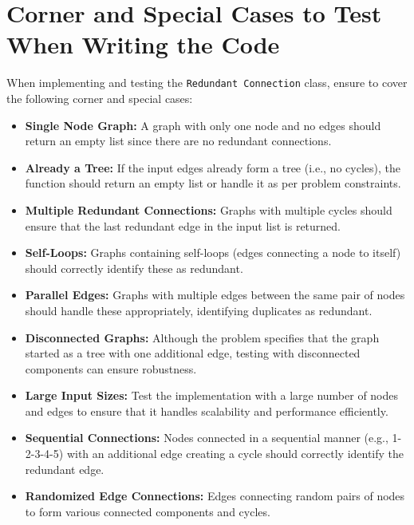 \section*{Corner and Special Cases to Test When Writing the Code}

When implementing and testing the \texttt{Redundant Connection} class, ensure to cover the following corner and special cases:

\begin{itemize}
    \item \textbf{Single Node Graph:}  
    A graph with only one node and no edges should return an empty list since there are no redundant connections.
    
    \item \textbf{Already a Tree:} 
    If the input edges already form a tree (i.e., no cycles), the function should return an empty list or handle it as per problem constraints.
    
    \item \textbf{Multiple Redundant Connections:} 
    Graphs with multiple cycles should ensure that the last redundant edge in the input list is returned.
    
    \item \textbf{Self-Loops:} 
    Graphs containing self-loops (edges connecting a node to itself) should correctly identify these as redundant.
    
    \item \textbf{Parallel Edges:} 
    Graphs with multiple edges between the same pair of nodes should handle these appropriately, identifying duplicates as redundant.
    
    \item \textbf{Disconnected Graphs:} 
    Although the problem specifies that the graph started as a tree with one additional edge, testing with disconnected components can ensure robustness.
    
    \item \textbf{Large Input Sizes:} 
    Test the implementation with a large number of nodes and edges to ensure that it handles scalability and performance efficiently.
    
    \item \textbf{Sequential Connections:} 
    Nodes connected in a sequential manner (e.g., 1-2-3-4-5) with an additional edge creating a cycle should correctly identify the redundant edge.
    
    \item \textbf{Randomized Edge Connections:} 
    Edges connecting random pairs of nodes to form various connected components and cycles.
\end{itemize}

